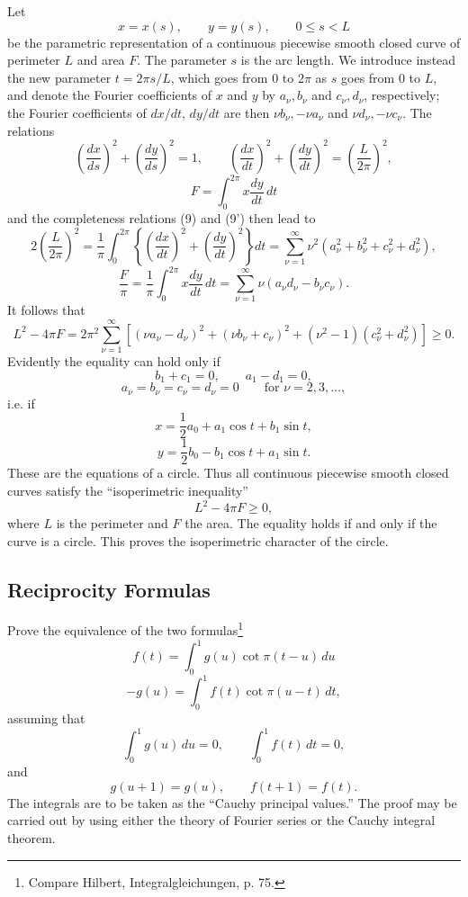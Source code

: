 Let
\[
x=x(s),\qquad y=y(s),\qquad 0\le s<L
\]
be the parametric representation of a continuous piecewise smooth closed curve of perimeter $L$ and area $F$. The parameter $s$ is the arc length. We introduce instead the new parameter $t=2\pi s/L$, which goes from $0$ to $2\pi$ as $s$ goes from $0$ to $L$, and denote the Fourier coefficients of $x$ and $y$ by $a_\nu,b_\nu$ and $c_\nu,d_\nu$, respectively; the Fourier coefficients of $dx/dt$, $dy/dt$ are then $\nu b_\nu,-\nu a_\nu$ and $\nu d_\nu,-\nu c_\nu$. The relations
\[
\left(\frac{dx}{ds}\right)^2+\left(\frac{dy}{ds}\right)^2=1,
\qquad
\left(\frac{dx}{dt}\right)^2+\left(\frac{dy}{dt}\right)^2=\left(\frac{L}{2\pi}\right)^2,
\]
\[
F=\int_0^{2\pi}x\frac{dy}{dt}\,dt
\]
and the completeness relations (9) and (9') then lead to
\[
2\left(\frac{L}{2\pi}\right)^2
=\frac{1}{\pi}\int_0^{2\pi}\left\{\left(\frac{dx}{dt}\right)^2+\left(\frac{dy}{dt}\right)^2\right\}dt
=\sum_{\nu=1}^{\infty}\nu^2(a_\nu^2+b_\nu^2+c_\nu^2+d_\nu^2),
\]
\[
\frac{F}{\pi}
=\frac{1}{\pi}\int_0^{2\pi}x\frac{dy}{dt}\,dt
=\sum_{\nu=1}^{\infty}\nu(a_\nu d_\nu-b_\nu c_\nu).
\]
It follows that
\[
L^2-4\pi F
=2\pi^2\sum_{\nu=1}^{\infty}\left[(\nu a_\nu-d_\nu)^2+(\nu b_\nu+c_\nu)^2+(\nu^2-1)(c_\nu^2+d_\nu^2)\right]\ge0.
\]
Evidently the equality can hold only if
\[
b_1+c_1=0,\qquad a_1-d_1=0,
\]
\[
a_\nu=b_\nu=c_\nu=d_\nu=0\qquad\text{for }\nu=2,3,\ldots,
\]
i.e. if
\[
x=\frac12a_0+a_1\cos t+b_1\sin t,
\]
\[
y=\frac12b_0-b_1\cos t+a_1\sin t.
\]
These are the equations of a circle. Thus all continuous piecewise smooth closed curves satisfy the ``isoperimetric inequality''
\begin{equation}
L^2-4\pi F\ge0,
\tag{37}
\end{equation}
where $L$ is the perimeter and $F$ the area. The equality holds if and only if the curve is a circle. This proves the isoperimetric character of the circle.

\subsection{Reciprocity Formulas}
Prove the equivalence of the two formulas\footnote{Compare Hilbert, Integralgleichungen, p. 75.}
\[
f(t)=\int_0^1g(u)\cot\pi(t-u)\,du
\]
\[
-g(u)=\int_0^1f(t)\cot\pi(u-t)\,dt,
\]
assuming that
\[
\int_0^1g(u)\,du=0,\qquad \int_0^1f(t)\,dt=0,
\]
and
\[
g(u+1)=g(u),\qquad f(t+1)=f(t).
\]
The integrals are to be taken as the ``Cauchy principal values.'' The proof may be carried out by using either the theory of Fourier series or the Cauchy integral theorem.

